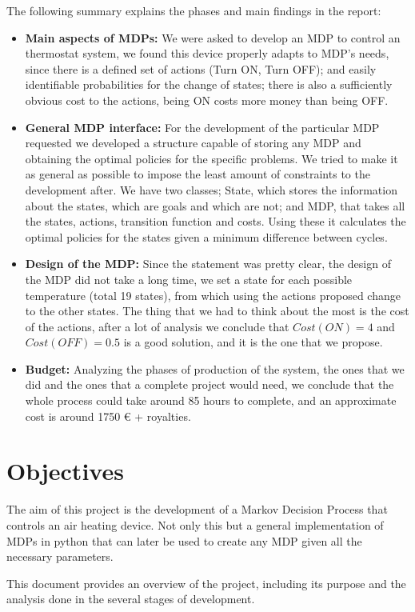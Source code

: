 \documentclass[12pt]{article}
\begin{document}
The following summary explains the phases and main findings in the report:
\begin{itemize}
\item \textbf{Main aspects of MDPs:} We were asked to develop an MDP to control an thermostat system, we found this device properly adapts to MDP’s needs, since there is a defined set of actions (Turn ON, Turn OFF); and easily identifiable probabilities for the change of states; there is also a sufficiently obvious cost to the actions, being ON costs more money than being OFF.
\item \textbf{General MDP interface:} For the development of the particular MDP requested we developed a structure capable of storing any MDP and obtaining the optimal policies for the specific problems. We tried to make it as general as possible to impose the least amount of constraints to the development after. We have two classes; State, which stores the information about the states, which are goals and which are not; and MDP, that takes all the states, actions, transition function and costs. Using these it calculates the optimal policies for the states given a minimum difference between cycles.
\item \textbf{Design of the MDP:} Since the statement was pretty clear, the design of the MDP did not take a long time, we set a state for each possible temperature (total 19 states), from which using the actions proposed change to the other states. The thing that we had to think about the most is the cost of the actions, after a lot of analysis we conclude that  \(Cost(ON) = 4\) and \(Cost(OFF) = 0.5\) is a good solution, and it is the one that we propose.
\item \textbf{Budget:} Analyzing the phases of production  of the system, the ones that we did and the ones that a complete project would need, we conclude that the whole process could take around 85 hours to complete, and an approximate cost is around 1750 € + royalties.
\end{itemize}
\newpage
\section{Objectives}
\label{sec:orgb4c5560}
The aim of this project is the development of a Markov Decision Process that controls an air heating device. Not only this but a general implementation of MDPs in python that can later be used to create any MDP given all the necessary parameters.\bigskip

This document provides an overview of the project, including its purpose and the analysis done in the several stages of development.\bigskip
\end{document}

